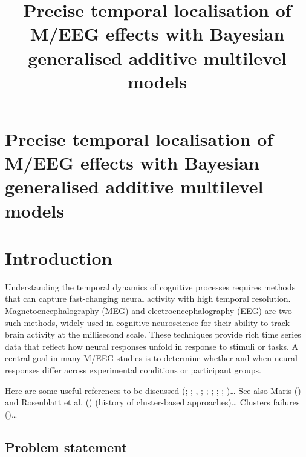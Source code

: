 \documentclass[
  doc,
  floatsintext,
  longtable,
  a4paper,
  nolmodern,
  notxfonts,
  notimes,
  colorlinks=true,linkcolor=blue,citecolor=blue,urlcolor=blue]{apa7}
\title{Precise temporal localisation of M/EEG effects with Bayesian
generalised additive multilevel models}
\begin{document}
\maketitle

\hypertarget{toc}{}
\tableofcontents
\newpage
\section[Introduction]{Precise temporal localisation of M/EEG effects
with Bayesian generalised additive multilevel models}

\setcounter{secnumdepth}{-\maxdimen} %

\setlength\LTleft{0pt}

\resetlinenumber[1]

\section{Introduction}\label{introduction}

Understanding the temporal dynamics of cognitive processes requires
methods that can capture fast-changing neural activity with high
temporal resolution. Magnetoencephalography (MEG) and
electroencephalography (EEG) are two such methods, widely used in
cognitive neuroscience for their ability to track brain activity at the
millisecond scale. These techniques provide rich time series data that
reflect how neural responses unfold in response to stimuli or tasks. A
central goal in many M/EEG studies is to determine whether and when
neural responses differ across experimental conditions or participant
groups.

Here are some useful references to be discussed
(;
;
,
; ; ;
;
;
)\ldots{} See also Maris
() and Rosenblatt et al.
() (history of cluster-based
approaches)\ldots{} Clusters failures ()\ldots{}

\subsection{Problem statement}\label{problem-statement}
\end{document}
